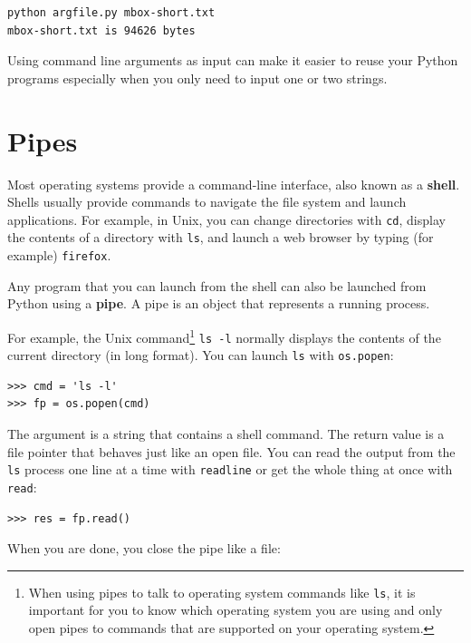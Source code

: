 \documentclass[11pt]{book}
\begin{document}
\beforeverb
\begin{verbatim}
python argfile.py mbox-short.txt
mbox-short.txt is 94626 bytes
\end{verbatim}
\afterverb
%
Using command line arguments as input can make it easier to reuse your Python programs 
especially when you only need to input one or two strings.

\section{Pipes}


Most operating systems provide a command-line interface,
also known as a {\bf shell}.  Shells usually provide commands
to navigate the file system and launch applications.  For
example, in Unix, you can change directories with {\tt cd},
display the contents of a directory with {\tt ls}, and launch
a web browser by typing (for example) {\tt firefox}.


Any program that you can launch from the shell can also be
launched from Python using a {\bf pipe}.  A pipe is an object
that represents a running process.

For example, the Unix command\footnote{When using pipes to talk 
to operating system commands like {\tt ls}, it is important 
for you to know which operating system you are using and only
open pipes to commands that are supported on your operating system.}
{\tt ls -l} normally displays the
contents of the current directory (in long format).  You can
launch {\tt ls} with {\tt os.popen}:


\beforeverb
\begin{verbatim}
>>> cmd = 'ls -l'
>>> fp = os.popen(cmd)
\end{verbatim}
\afterverb
%
The argument is a string that contains a shell command.  The
return value is a file pointer that behaves just like an open
file.  You can read the output from the {\tt ls} process one
line at a time with {\tt readline} or get the whole thing at
once with {\tt read}:


\beforeverb
\begin{verbatim}
>>> res = fp.read()
\end{verbatim}
\afterverb
%
When you are done, you close the pipe like a file:
\end{document}
